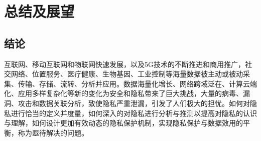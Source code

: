 \chapter{总结及展望}
\label{chap:conclusions}


\section{结论}
互联网、移动互联网和物联网快速发展，以及5G技术的不断推进和商用推广，社交网络、位置服务、医疗健康、生物基因、工业控制等海量数据被主动或被动采集、传输、存储、流转、分析并应用。数据海量化增长、网络跨域泛在、计算云端化、应用多样复杂化等新的变化为安全和隐私带来了巨大挑战，大量的病毒、漏洞、攻击和数据关联分析，致使隐私严重泄漏，引发了人们极大的担忧。如何对隐私进行恰当的定义并度量，如何深入的对隐私进行分析与推测以提高对隐私的认识与理解，如何设计更加有效动态的隐私保护机制，实现隐私保护与数据效用的平衡，称为亟待解决的问题。

